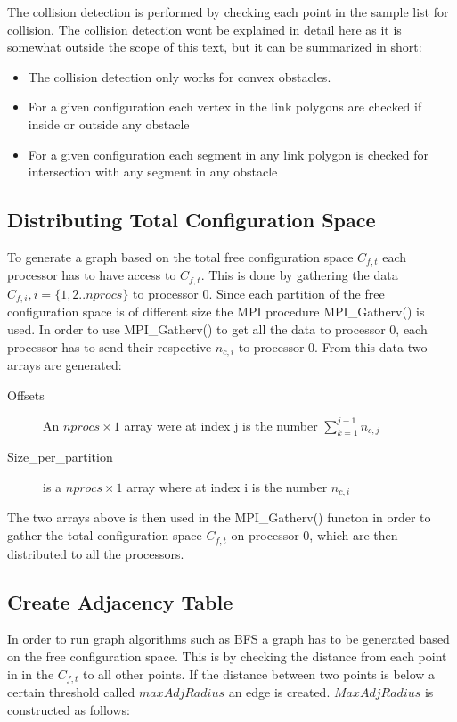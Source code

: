 The collision detection is performed by checking each point in the sample list for collision. The collision detection wont be explained in detail here as it is somewhat outside the scope of this text, but it can be summarized in short:

\begin{itemize} 
 \item The collision detection only works for convex obstacles. 
\item For a given configuration each vertex in the link polygons are checked if inside or outside any obstacle
\item For a given configuration each segment in any link polygon is checked for intersection with any segment in any obstacle
 \end{itemize}



\subsection{\textbf{Distributing Total Configuration Space}}
\label{sec:distribute}
To generate a graph based on the total free configuration space $C_{f,t}$ each processor has to have access to $C_{f,t}$. This is done by gathering the data $C_{f,i}, i=\{1,2..nprocs\}$ to processor 0. Since each partition of the free configuration space is of different size the MPI procedure MPI\_Gatherv() is used. In order to use MPI\_Gatherv() to get all the data to processor 0, each processor has to send their respective $n_{c,i}$ to processor 0. From this data two arrays are generated:


\begin{description}
\item[Offsets] An $nprocs \times 1$ array were at index j is the number $\sum_{k=1}^{j-1} n_{c,j}$
\item[Size\_per\_partition] is a $nprocs \times 1$ array where at index i is the number $n_{c,i}$
\end{description}

The two arrays above is then used in the MPI\_Gatherv() functon in order to gather the total configuration space $C_{f,t}$ on processor 0, which are then distributed to all the processors.


\subsection{\textbf{Create Adjacency Table}}
In order to run graph algorithms such as BFS a graph has to be generated based on the free configuration space. This is by checking the distance from each point in in the $C_{f,t}$ to all other points. If the distance between two points is below a certain threshold called  $maxAdjRadius$ an edge is created. $MaxAdjRadius$ is constructed as follows:

